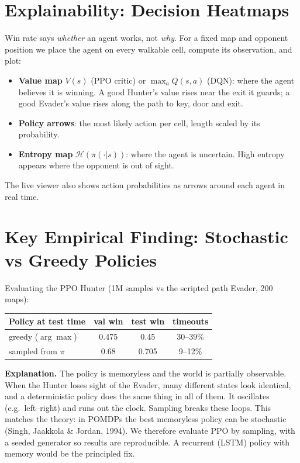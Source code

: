 \documentclass[11pt,a4paper]{article}
\begin{document}
\section{Explainability: Decision Heatmaps}
Win rate says \emph{whether} an agent works, not \emph{why}. For a fixed map and opponent position
we place the agent on every walkable cell, compute its observation, and plot:
\begin{itemize}
  \item \textbf{Value map} $V(s)$ (PPO critic) or $\max_aQ(s,a)$ (DQN): where the agent believes it is
        winning. A good Hunter's value rises near the exit it guards; a good Evader's value rises
        along the path to key, door and exit.
  \item \textbf{Policy arrows}: the most likely action per cell, length scaled by its probability.
  \item \textbf{Entropy map} $\mathcal{H}(\pi(\cdot|s))$: where the agent is uncertain. High entropy
        appears where the opponent is out of sight.
\end{itemize}
The live viewer also shows action probabilities as arrows around each agent in real time.

\section{Key Empirical Finding: Stochastic vs Greedy Policies}
Evaluating the PPO Hunter (1M samples vs the scripted path Evader, 200 maps):
\begin{center}
\begin{tabular}{lccc}
\toprule
Policy at test time & val win & test win & timeouts\\
\midrule
greedy ($\arg\max$) & 0.475 & 0.45 & 30--39\%\\
sampled from $\pi$ & 0.68 & 0.705 & 9--12\%\\
\bottomrule
\end{tabular}
\end{center}
\textbf{Explanation.} The policy is memoryless and the world is partially observable. When the
Hunter loses sight of the Evader, many different states look identical, and a deterministic policy
does the same thing in all of them. It oscillates (e.g.\ left--right) and runs out the clock.
Sampling breaks these loops. This matches the theory: in POMDPs the best memoryless policy can be
stochastic (Singh, Jaakkola \& Jordan, 1994). We therefore evaluate PPO by sampling, with a seeded
generator so results are reproducible. A recurrent (LSTM) policy with memory would be the
principled fix.
\end{document}
